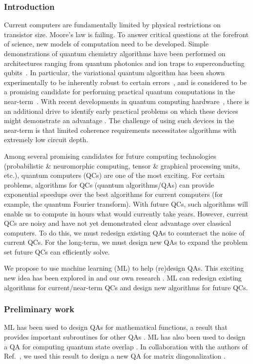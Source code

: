 \documentclass[10pt]{article}
\begin{document}
\subsubsection{ Introduction}  Current computers are fundamentally limited by physical restrictions on transistor size.  Moore's law is failing. To answer critical questions at the forefront of science, new models of computation need to be developed.  Simple demonstrations of
quantum chemistry algorithms have been performed on architectures
ranging from quantum photonics and ion traps to superconducting
qubits~\cite{Lanyon2010,Li2011,Wang2014,Peruzzo2013,Shen2015,OMalley2016,Kandala2017}. In
particular, the variational quantum algorithm
\cite{Peruzzo2013,McClean2015} has been shown experimentally to be
inherently robust to certain errors~\cite{OMalley2016}, and is
considered to be a promising candidate for performing practical
quantum computations in the near-term~\cite{Wecker2015a,Mueck2015}. With recent developments in quantum computing
hardware~\cite{Corcoles2015,Riste2015,Kelly2015,Barends2016,Roushan2017},
there is an additional drive to identify early practical problems on
which these devices might demonstrate an advantage
\cite{Mohseni2017,Boixo2016}. The challenge of using such devices in
the near-term is that limited coherence requirements necessitates
algorithms with extremely low circuit depth. 

Among several promising candidates for future computing technologies (probabilistic \& neuromorphic computing, tensor \& graphical processing units, etc.), quantum computers (QCs) are one of the most exciting. For certain problems, algorithms for QCs (quantum algorithms/QAs) can provide exponential speedups over the best algorithms for current computers (for example, the quantum Fourier transform). With future QCs, such algorithms will enable us to compute in hours what would currently take years. However, current QCs are noisy and have not yet demonstrated clear advantage over classical computers. To do this, we must redesign existing QAs to counteract the noise of current QCs. For the long-term, we must design new QAs to expand the problem set future QCs can efficiently solve.


We propose to use machine learning (ML) to help (re)design QAs. This exciting new idea has been explored in \cite{Mitarai2018,Cincio2018} and our own research \cite{Khatri2018}. ML can redesign existing algorithms for current/near-term QCs and design new algorithms for future QCs.


\subsubsection{Preliminary work} ML has been used to design QAs for mathematical functions, a result that provides important subroutines for other QAs \cite{Mitarai2018}. ML has also been used to design a QA for computing quantum state overlap \cite{Cincio2018}. In collaboration with the authors of Ref.~\cite{Cincio2018}, we used this result to design a new QA for matrix diagonalization \cite{LaRose2018}.
\end{document}
